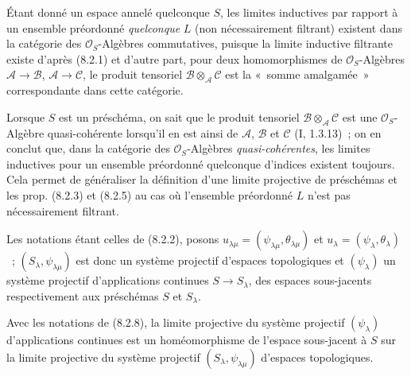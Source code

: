 \begin{remark}[8.2.7]
\label{IV.8.2.7-fr}
Étant donné un espace annelé quelconque $S$, les limites inductives par
rapport à un ensemble préordonné \emph{quelconque} $L$ (non nécessairement
filtrant) existent dans la catégorie des $\mathcal O_S$-Algèbres
commutatives, puisque la limite inductive filtrante existe d'après (8.2.1) et
d'autre part, pour deux homomorphismes de $\mathcal O_S$-Algèbres
$\mathscr A\to\mathscr B$, $\mathscr A\to\mathscr C$, le produit tensoriel
$\mathscr B\otimes_{\mathscr A}\mathscr C$ est la «~somme amalgamée~»
correspondante dans cette catégorie.

Lorsque $S$ est un préschéma, on sait que le produit tensoriel
$\mathscr B\otimes_{\mathscr A}\mathscr C$ est une $\mathcal O_S$-Algèbre
quasi-cohérente lorsqu'il en est ainsi de $\mathscr A$, $\mathscr B$ et
$\mathscr C$ (I, 1.3.13)~; on en conclut que, dans la catégorie des
$\mathcal O_S$-Algèbres \emph{quasi-cohérentes}, les limites inductives pour
un ensemble préordonné quelconque d'indices existent toujours. Cela permet de
généraliser la définition d'une limite projective de préschémas et les prop.
(8.2.3) et (8.2.5) au cas où l'ensemble préordonné $L$ n'est pas
nécessairement filtrant.
\end{remark}

\begin{env}[8.2.8]
\label{IV.8.2.8-fr}
Les notations étant celles de (8.2.2), posons
$u_{\lambda\mu}=(\psi_{\lambda\mu},\theta_{\lambda\mu})$ et
$u_\lambda=(\psi_\lambda,\theta_\lambda)$~; $(S_\lambda,\psi_{\lambda\mu})$
est donc un système projectif d'espaces topologiques et $(\psi_\lambda)$ un
système projectif d'applications continues $S\to S_\lambda$, des espaces
sous-jacents respectivement aux préschémas $S$ et $S_\lambda$.
\end{env}

\begin{proposition}[8.2.9]
\label{IV.8.2.9-fr}
Avec les notations de (8.2.8), la limite projective du système projectif
$(\psi_\lambda)$ d'applications continues est un homéomorphisme de l'espace
sous-jacent à $S$ sur la limite projective du système projectif
$(S_\lambda,\psi_{\lambda\mu})$ d'espaces topologiques.
\end{proposition}

